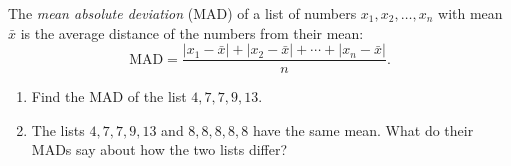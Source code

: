 The \emph{mean absolute deviation} (MAD) of a list of numbers $x_1,x_2,\dots,x_n$ with mean $\bar x$ is the average distance of the numbers from their mean:
\[\text{MAD}=\dfrac{|x_1-\bar x|+|x_2-\bar x|+\cdots+|x_n-\bar x|}{n}.\]
\begin{enumerate}
\item[(a)] Find the MAD of the list $4,7,7,9,13$.
\item[(b)] The lists $4,7,7,9,13$ and $8,8,8,8,8$ have the same mean. What do their MADs say about how the two lists differ?
\end{enumerate}
